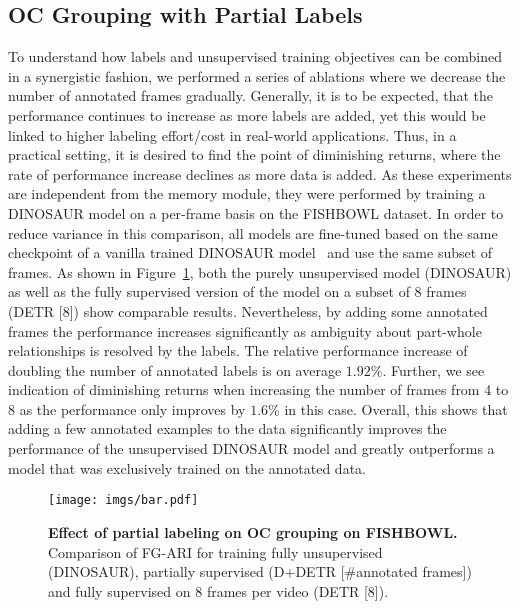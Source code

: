 \documentclass[10pt,twocolumn,letterpaper]{article}
\begin{document}
\begin{appendices}
\section{OC Grouping with Partial Labels}
To understand how labels and unsupervised training objectives can be combined in a synergistic fashion, we performed a series of ablations where we decrease the number of annotated frames gradually.  Generally, it is to be expected, that the performance continues to increase as more labels are added, yet this would be linked to higher labeling effort/cost in real-world applications. Thus, in a practical setting, it is desired to find the point of diminishing returns, where the rate of performance increase declines as more data is added. As these experiments are independent from the memory module, they were performed by training a DINOSAUR model on a per-frame basis on the FISHBOWL dataset.
In order to reduce variance in this comparison, all models are fine-tuned based on the same checkpoint of a vanilla trained DINOSAUR model~\cite{seitzer2022bridging} and use the same subset of frames. 
As shown in Figure~\ref{fig:ablation}, both the purely unsupervised model (DINOSAUR) as well as the fully supervised version of the model on a subset of 8 frames (DETR [8]) show comparable results.  Nevertheless, by adding some annotated frames the performance increases significantly as ambiguity about part-whole relationships is resolved by the labels. The relative performance increase of doubling the number of annotated labels is on average $1.92$\%. Further, we see indication of diminishing returns when increasing the number of frames from 4 to 8 as the performance only improves by $1.6$\% in this case. Overall, this shows that adding a few annotated examples to the data significantly improves the performance of the unsupervised DINOSAUR model and greatly outperforms a model that was exclusively trained on the annotated data.
\begin{figure}[t]
	\centering
	\texttt{[image: imgs/bar.pdf]}
\caption{\textbf{Effect of partial labeling on OC grouping on FISHBOWL.} Comparison of FG-ARI for training fully unsupervised (DINOSAUR), partially supervised (D+DETR [\#annotated frames]) and fully supervised on 8 frames per video (DETR [8]).}
\label{fig:ablation}
\end{figure}


\end{appendices}
\end{document}
